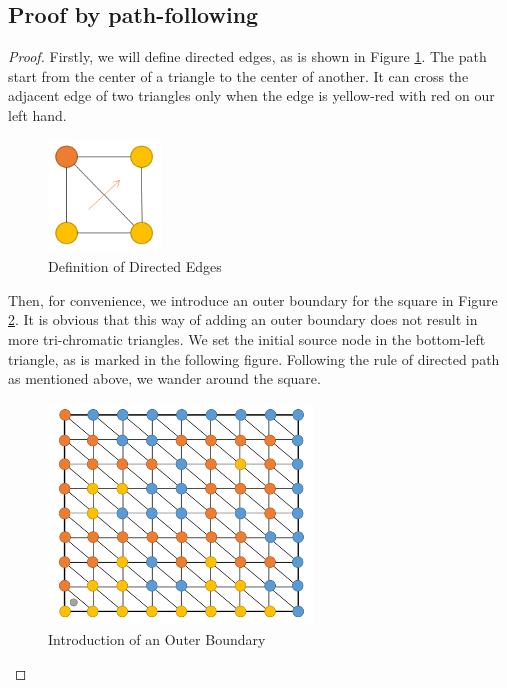 \documentclass[oneside,solution]{seu-ml-assign}
\begin{document}
\subsection{Proof by path-following}
\begin{proof}
Firstly, we will define directed edges, as is shown in Figure \ref{fig:2}.
The path start from the center of a triangle to the center of another.
It can cross the adjacent edge of two triangles only when the edge is
yellow-red with red on our left hand.

\begin{figure}[H]
\centering
\includegraphics[width=3cm]{Figure/g2.png}
\caption{Definition of Directed Edges}
\label{fig:2}
\end{figure}

Then, for convenience, we introduce an outer boundary for the square in
Figure \ref{gra:3}. It is obvious that this way of adding an outer boundary
does not result in more tri-chromatic triangles. We set the initial
source node in the bottom-left triangle, as is marked in the following
figure. Following the rule of directed path as mentioned above, we
wander around the square.

\begin{figure}[H]
\centering
\includegraphics[width=7cm]{Figure/g3.png}
\caption{Introduction of an Outer Boundary}
\label{gra:3}
\end{figure}


\end{proof}
\end{document}
